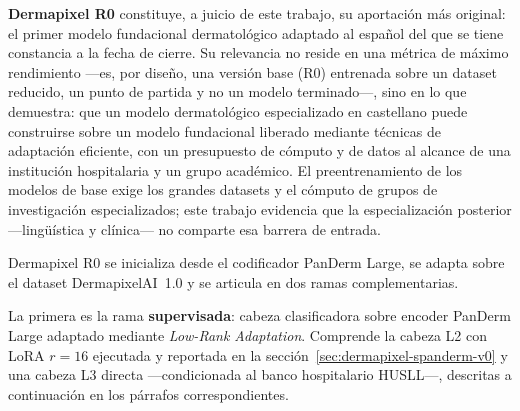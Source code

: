 \textbf{Dermapixel R0} constituye, a juicio de este trabajo, su
aportación más original: el primer modelo fundacional dermatológico
adaptado al español del que se tiene constancia a la fecha de cierre.
Su relevancia no reside en una métrica de máximo rendimiento ---es,
por diseño, una versión base (R0) entrenada sobre un dataset reducido,
un punto de partida y no un modelo terminado---, sino en lo que
demuestra: que un modelo dermatológico especializado en castellano
puede construirse sobre un modelo fundacional liberado mediante
técnicas de adaptación eficiente, con un presupuesto de cómputo y de
datos al alcance de una institución hospitalaria y un grupo académico.
El preentrenamiento de los modelos de base exige los grandes datasets
y el cómputo de grupos de investigación especializados; este trabajo
evidencia que la especialización posterior ---lingüística y
clínica--- no comparte esa barrera de entrada.

Dermapixel R0 se inicializa desde el codificador PanDerm Large, se
adapta sobre el dataset DermapixelAI~1.0 y se articula en dos ramas
complementarias.

La primera es la rama \textbf{supervisada}: cabeza clasificadora
sobre encoder PanDerm Large adaptado mediante \emph{Low-Rank
Adaptation}. Comprende la cabeza L2 con LoRA $r=16$
ejecutada y reportada en la
sección~\ref{sec:dermapixel-spanderm-v0} y una cabeza L3 directa
---condicionada al banco hospitalario HUSLL---,
descritas a continuación en los párrafos correspondientes.

